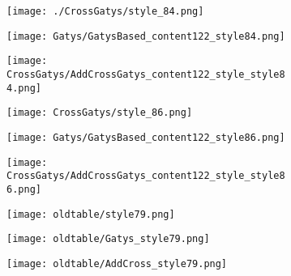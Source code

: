 \documentclass[runningheads]{llncs}
\begin{document}
\begin{figure}[!htbp]
  \centering
  \begin{subfigure}[b]{0.3\linewidth}
    \texttt{[image: ./CrossGatys/style\_84.png]}
  \end{subfigure}
  \begin{subfigure}[b]{0.3\linewidth}
    \texttt{[image: Gatys/GatysBased\_content122\_style84.png]}
  \end{subfigure}
  \begin{subfigure}[b]{0.3\linewidth}
    \texttt{[image: CrossGatys/AddCrossGatys\_content122\_style\_style84.png]}
  \end{subfigure}


  \begin{subfigure}[b]{0.3\linewidth}
    \texttt{[image: CrossGatys/style\_86.png]}
  \end{subfigure}
  \begin{subfigure}[b]{0.3\linewidth}
    \texttt{[image: Gatys/GatysBased\_content122\_style86.png]}
  \end{subfigure}
  \begin{subfigure}[b]{0.3\linewidth}
    \texttt{[image: CrossGatys/AddCrossGatys\_content122\_style\_style86.png]}
  \end{subfigure}
  
  
  \begin{subfigure}[b]{0.3\linewidth}
    \texttt{[image: oldtable/style79.png]}
  \end{subfigure}
  \begin{subfigure}[b]{0.3\linewidth}
    \texttt{[image: oldtable/Gatys\_style79.png]}
  \end{subfigure}
  \begin{subfigure}[b]{0.3\linewidth}
    \texttt{[image: oldtable/AddCross\_style79.png]}
  \end{subfigure}  
  

\end{figure}
\end{document}
